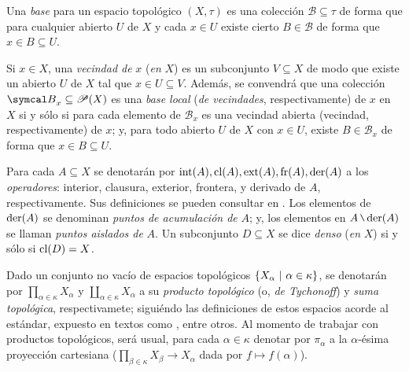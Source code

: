 Una \textit{base} para un espacio topológico $(X,\tau)$ es una colección $\mathcal{B} \subseteq \tau$ de forma que para cualquier abierto $U$ de $X$ y cada $x \in U$ existe cierto $B \in \mathcal{B}$ de forma que $x \in B \subseteq U$.



Si $x \in X$, una \textit{vecindad de} $x$ (\textit{en} $X$) es un subconjunto $V \subseteq X$ de modo que existe un abierto $U$ de $X$ tal que $x \in U \subseteq V$. Además, se convendrá que una colección $\mathcal{B}_x \subseteq \ms{P}(X)$ es una \textit{base local} (\textit{de vecindades}, respectivamente) de $x$ en $X$ si y sólo si para cada elemento de $\mathcal{B}_x$ es una vecindad abierta (vecindad, respectivamente) de $x$; y, para todo abierto $U$ de $X$ con $x \in U$, existe $B \in \mathcal{B}_x$ de forma que $x \in B \subseteq U$.

Para cada $A \subseteq X$ se denotarán por $\operatorname{int}(A),\operatorname{cl}(A),\operatorname{ext}(A),\operatorname{fr}(A),\operatorname{der}(A)$ a los \textit{operadores}: interior, clausura, exterior, frontera, y derivado de $A$, respectivamente. Sus definiciones se pueden consultar en \cite[Cap.~2]{fidelElementos}. Los elementos de $\operatorname{der}(A)$ se denominan \textit{puntos de acumulación de} $A$; y, los elementos en $A \setminus \der(A)$ se llaman \textit{puntos aislados de} $A$. Un subconjunto $D \subseteq X$ se dice \textit{denso} (\textit{en} $X$) si y sólo si $\operatorname{cl}(D)=X$.

Dado un conjunto no vacío de espacios topológicos $\{X_\alpha \text{ $|$ } \alpha \in \kappa \}$, se denotarán por $ \prod_{\alpha \in \kappa} X_\alpha$ y $ \coprod_{\alpha \in \kappa} X_\alpha$ a su \textit{producto topológico} (o, \textit{de Tychonoff}) y \textit{suma topológica}, respectivamete; siguiéndo las definiciones de estos espacios acorde al estándar, expuesto en textos como \cite{fidelElementos,munkresTopology}, entre otros. Al momento de trabajar con productos topológicos, será usual, para cada $\alpha \in \kappa$ denotar por $\pi_\alpha$ a la $\alpha$-ésima proyección cartesiana ($ \prod_{\beta \in \kappa} X_\beta \to X_\alpha$ dada por $f \mapsto f(\alpha)$).

